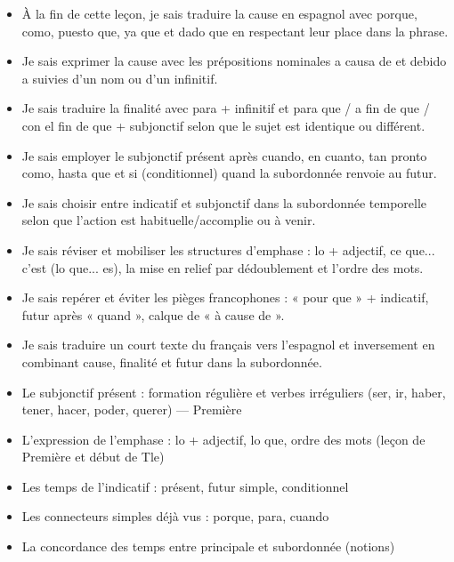 \documentclass[11pt]{article}
\begin{document}
\begin{objectifs}
\begin{itemize}
\item À la fin de cette leçon, je sais traduire la cause en espagnol avec porque, como, puesto que, ya que et dado que en respectant leur place dans la phrase.
\item Je sais exprimer la cause avec les prépositions nominales a causa de et debido a suivies d'un nom ou d'un infinitif.
\item Je sais traduire la finalité avec para + infinitif et para que / a fin de que / con el fin de que + subjonctif selon que le sujet est identique ou différent.
\item Je sais employer le subjonctif présent après cuando, en cuanto, tan pronto como, hasta que et si (conditionnel) quand la subordonnée renvoie au futur.
\item Je sais choisir entre indicatif et subjonctif dans la subordonnée temporelle selon que l'action est habituelle/accomplie ou à venir.
\item Je sais réviser et mobiliser les structures d'emphase : lo + adjectif, ce que... c'est (lo que... es), la mise en relief par dédoublement et l'ordre des mots.
\item Je sais repérer et éviter les pièges francophones : « pour que » + indicatif, futur après « quand », calque de « à cause de ».
\item Je sais traduire un court texte du français vers l'espagnol et inversement en combinant cause, finalité et futur dans la subordonnée.
\end{itemize}
\end{objectifs}

\begin{prerequis}
\begin{itemize}
\item Le subjonctif présent : formation régulière et verbes irréguliers (ser, ir, haber, tener, hacer, poder, querer) — Première
\item L'expression de l'emphase : lo + adjectif, lo que, ordre des mots (leçon de Première et début de Tle)
\item Les temps de l'indicatif : présent, futur simple, conditionnel
\item Les connecteurs simples déjà vus : porque, para, cuando
\item La concordance des temps entre principale et subordonnée (notions)
\end{itemize}
\end{prerequis}
\end{document}
